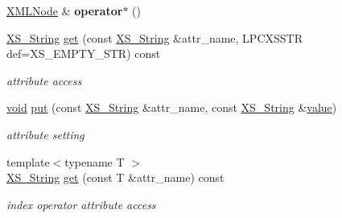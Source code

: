 \begin{DoxyCompactItemize}
\item 
\mbox{\label{struct_x_m_l_storage_1_1_x_m_l_pos_a8d8fb93fed6763af9c9c31743175ba69}} 
\hyperlink{struct_x_m_l_storage_1_1_x_m_l_node}{X\+M\+L\+Node} \& {\bfseries operator$\ast$} ()
\item 
\mbox{\label{struct_x_m_l_storage_1_1_x_m_l_pos_a113a8ea39c4a282b0222220711dfd66f}} 
\hyperlink{struct_x_m_l_storage_1_1_x_s___string}{X\+S\+\_\+\+String} \hyperlink{struct_x_m_l_storage_1_1_x_m_l_pos_a113a8ea39c4a282b0222220711dfd66f}{get} (const \hyperlink{struct_x_m_l_storage_1_1_x_s___string}{X\+S\+\_\+\+String} \&attr\+\_\+name, L\+P\+C\+X\+S\+S\+TR def=X\+S\+\_\+\+E\+M\+P\+T\+Y\+\_\+\+S\+TR) const
\begin{DoxyCompactList}\small\item\em attribute access \end{DoxyCompactList}\item 
\mbox{\label{struct_x_m_l_storage_1_1_x_m_l_pos_a2d8e2983103b9ad0919b75753fb0899b}} 
\hyperlink{interfacevoid}{void} \hyperlink{struct_x_m_l_storage_1_1_x_m_l_pos_a2d8e2983103b9ad0919b75753fb0899b}{put} (const \hyperlink{struct_x_m_l_storage_1_1_x_s___string}{X\+S\+\_\+\+String} \&attr\+\_\+name, const \hyperlink{struct_x_m_l_storage_1_1_x_s___string}{X\+S\+\_\+\+String} \&\hyperlink{unionvalue}{value})
\begin{DoxyCompactList}\small\item\em attribute setting \end{DoxyCompactList}\item 
\mbox{\label{struct_x_m_l_storage_1_1_x_m_l_pos_abb88be246b0a9e2f20b6f3523cb8c4f1}} 
{\footnotesize template$<$typename T $>$ }\\\hyperlink{struct_x_m_l_storage_1_1_x_s___string}{X\+S\+\_\+\+String} \hyperlink{struct_x_m_l_storage_1_1_x_m_l_pos_abb88be246b0a9e2f20b6f3523cb8c4f1}{get} (const T \&attr\+\_\+name) const
\begin{DoxyCompactList}\small\item\em index operator attribute access \end{DoxyCompactList}\item 
\mbox{\label{struct_x_m_l_storage_1_1_x_m_l_pos_af62737abea26fcefe3a84748bf0dac6a}} 

\end{DoxyCompactItemize}
